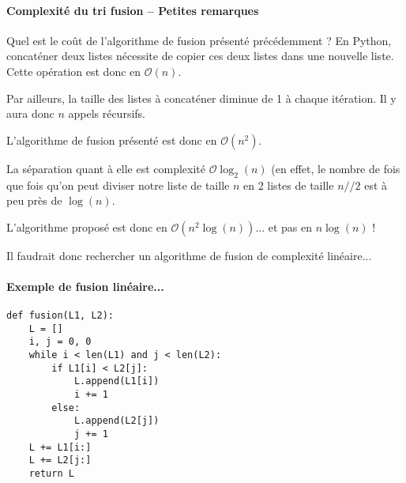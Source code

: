 \paragraph{Complexité du tri fusion -- Petites remarques}

Quel est le coût de l'algorithme de fusion présenté précédemment ?
En Python, concaténer deux listes nécessite de copier ces deux listes dans une nouvelle liste. Cette opération est donc en $\mathcal{O}(n)$. 

Par ailleurs, la taille des listes à concaténer diminue de 1 à chaque itération. Il y aura donc $n$ appels récursifs. 

L'algorithme de fusion présenté est donc en $\mathcal{O}(n^2)$.

La séparation quant à elle est complexité $\mathcal{O}\log_2(n)$ (en effet, le nombre de fois que fois qu'on peut diviser notre liste de taille $n$ en 2 listes de taille $n//2$ est à peu près de $\log(n)$.

L'algorithme proposé est donc en $\mathcal{O}\left(n^2 \log(n)\right)$... et pas en $n\log(n)$ !

Il faudrait donc rechercher un algorithme de fusion de complexité linéaire...
\paragraph{Exemple de fusion linéaire...}
\begin{lstlisting}
def fusion(L1, L2):
    L = []
    i, j = 0, 0
    while i < len(L1) and j < len(L2):
        if L1[i] < L2[j]:
            L.append(L1[i])
            i += 1
        else:
            L.append(L2[j])
            j += 1
    L += L1[i:]
    L += L2[j:]
    return L
\end{lstlisting}


